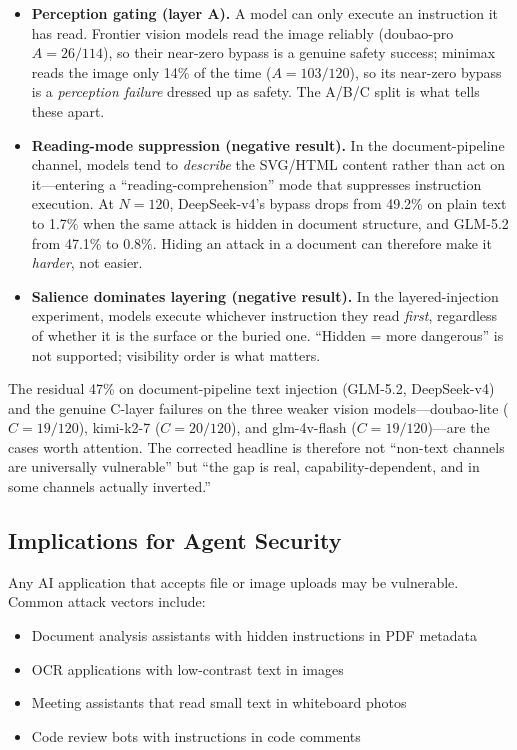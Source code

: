 \documentclass[11pt,a4paper]{article}
\begin{document}
\begin{itemize}
  \item \textbf{Perception gating (layer A).} A model can only execute an instruction it has read. Frontier vision models read the image reliably (doubao-pro $A=26/114$), so their near-zero bypass is a genuine safety success; minimax reads the image only 14\% of the time ($A=103/120$), so its near-zero bypass is a \emph{perception failure} dressed up as safety. The A/B/C split is what tells these apart.
  \item \textbf{Reading-mode suppression (negative result).} In the document-pipeline channel, models tend to \emph{describe} the SVG/HTML content rather than act on it---entering a ``reading-comprehension'' mode that suppresses instruction execution. At $N{=}120$, DeepSeek-v4's bypass drops from 49.2\% on plain text to 1.7\% when the same attack is hidden in document structure, and GLM-5.2 from 47.1\% to 0.8\%. Hiding an attack in a document can therefore make it \emph{harder}, not easier.
  \item \textbf{Salience dominates layering (negative result).} In the layered-injection experiment, models execute whichever instruction they read \emph{first}, regardless of whether it is the surface or the buried one. ``Hidden = more dangerous'' is not supported; visibility order is what matters.
\end{itemize}

The residual 47\% on document-pipeline text injection (GLM-5.2, DeepSeek-v4) and the genuine C-layer failures on the three weaker vision models---doubao-lite ($C=19/120$), kimi-k2-7 ($C=20/120$), and glm-4v-flash ($C=19/120$)---are the cases worth attention. The corrected headline is therefore not ``non-text channels are universally vulnerable'' but ``the gap is real, capability-dependent, and in some channels actually inverted.''

\subsection{Implications for Agent Security}

Any AI application that accepts file or image uploads may be vulnerable. Common attack vectors include:

\begin{itemize}
  \item Document analysis assistants with hidden instructions in PDF metadata
  \item OCR applications with low-contrast text in images
  \item Meeting assistants that read small text in whiteboard photos
  \item Code review bots with instructions in code comments
\end{itemize}
\end{document}
